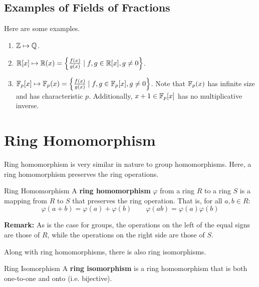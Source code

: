 \documentclass[letterpaper]{article}
\begin{document}
\subsection{Examples of Fields of Fractions}
Here are some examples.
\begin{enumerate}
    \item $\mathbb{Z} \mapsto \mathbb{Q}$. 
    \item $\mathbb{R}[x] \mapsto \mathbb{R}(x) = \left\{\frac{f(x)}{g(x)} \mid f, g \in \mathbb{R}[x], g \neq 0\right\}$.
    \item $\mathbb{F}_{p}[x] \mapsto \mathbb{F}_{p}(x) = \left\{\frac{f(x)}{g(x)} \mid f, g \in \mathbb{F}_{p}[x], g \neq 0\right\}$. Note that $\mathbb{F}_{p}(x)$ has infinite size and has characteristic $p$. Additionally, $x + 1 \in \mathbb{F}_{p}[x]$ has no multiplicative inverse.
\end{enumerate}


\section{Ring Homomorphism}
Ring homomorphism is very similar in nature to group homomorphisms. Here, a ring homomorphism preserves the ring operations.

\begin{definition}{Ring Homomorphism}{}
    A \textbf{ring homomorphism} $\varphi$ from a ring $R$ to a ring $S$ is a mapping from $R$ to $S$ that preserves the ring operation. That is, for all $a, b \in R$:
    \[\varphi(a + b) = \varphi(a) + \varphi(b) \qquad \varphi(ab) = \varphi(a)\varphi(b)\]
\end{definition}
\textbf{Remark:} As is the case for groups, the operations on the left of the equal signs are those of $R$, while the operations on the right side are those of $S$. 

\bigskip

Along with ring homomorphisms, there is also ring isomorphisms.
\begin{definition}{Ring Isomorphism}{}
    A \textbf{ring isomorphism} is a ring homomorphism that is both one-to-one and onto (i.e. bijective).
\end{definition}
\end{document}
